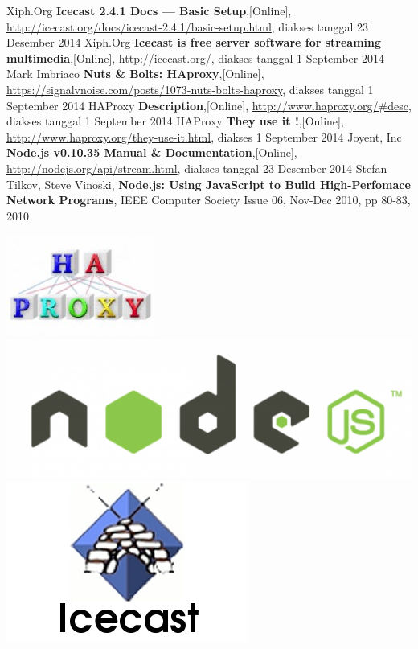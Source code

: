 \documentclass[a0,portrait]{a0poster}
\begin{document}
\begin{multicols}{2}
\begin{tcolorbox}[colback=blue!5!white,colframe=green!75!black,title=Metode]
\end{tcolorbox}


\begin{tcolorbox}[colback=blue!5!white,colframe=blue!75!black,title=Referensi,fontupper=\normalsize]

	\begin{thebibliography}{9}
		Xiph.Org
		\textbf{Icecast 2.4.1 Docs — Basic Setup},[Online],
		\url{http://icecast.org/docs/icecast-2.4.1/basic-setup.html},
		diakses tanggal 23 Desember 2014
		Xiph.Org
		\textbf{Icecast is free server software for streaming multimedia},[Online],
		\url{http://icecast.org/},
		diakses tanggal 1 September 2014
		Mark Imbriaco
		\textbf{Nuts \& Bolts: HAproxy},[Online],
		\url{https://signalvnoise.com/posts/1073-nuts-bolts-haproxy},
		diakses tanggal 1 September 2014
		HAProxy
		\textbf{Description},[Online],
		\url{http://www.haproxy.org/#desc},
		diakses tanggal 1 September 2014
		HAProxy
		\textbf{They use it !},[Online],
		\url{http://www.haproxy.org/they-use-it.html},
		diakses 1 September 2014
		Joyent, Inc
		\textbf{Node.js v0.10.35 Manual \& Documentation},[Online],
		\url{http://nodejs.org/api/stream.html},
		diakses tanggal 23 Desember 2014
		Stefan Tilkov, Steve Vinoski,
		\textbf{Node.js: Using JavaScript to Build High-Perfomace Network Programs},
		IEEE Computer Society Issue 06, Nov-Dec 2010,
		pp 80-83, 2010
		
	\end{thebibliography}
	
\end{tcolorbox}





\end{multicols}

\LARGE
\begin{tcolorbox}[colback=blue!5!white,colframe=red!75!white,title= ]
	
	\includegraphics[width=0.25\linewidth]{logo-haproxy}	\hfill
	\includegraphics[width=0.25\linewidth]{logo-nodejs} \hfill
	\includegraphics[width=0.25\linewidth]{logo-icecast}
	
\end{tcolorbox}
\end{document}
